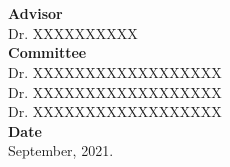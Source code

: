 
\inbpdocument



\renewcommand{\chaptermark}[1]{\markboth{#1}{}}


\chapter*{}


\mbox{}
\vfill
\noindent 
{\bfseries Advisor}\\
Dr. XXXXXXXXXX\\

\noindent 
{\bfseries Committee}\\
Dr. XXXXXXXXXXXXXXXXXX\\
Dr. XXXXXXXXXXXXXXXXXX\\
Dr. XXXXXXXXXXXXXXXXXX \\

\noindent
{\bfseries Date}\\
September, 2021.

